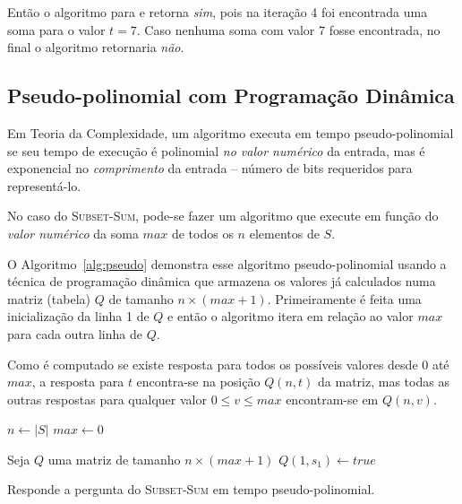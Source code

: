 Então o algoritmo para e retorna \textit{sim}, pois na iteração 4 foi encontrada uma soma para o valor  $t = 7$. Caso nenhuma soma com valor 7 fosse encontrada, no final o algoritmo retornaria \textit{não}.

\subsection{Pseudo-polinomial com Programação Dinâmica}

Em Teoria da Complexidade, um algoritmo executa em tempo pseudo-polinomial se seu tempo de execução é polinomial \textit{no valor numérico} da entrada, mas é exponencial no \textit{comprimento} da entrada -- número de bits requeridos para representá-lo.

No caso do \textsc{Subset-Sum}, pode-se fazer um algoritmo que execute em função do \textit{valor numérico} da soma $max$ de todos os $n$ elementos de $S$.

O Algoritmo~\ref{alg:pseudo} demonstra esse algoritmo pseudo-polinomial usando a técnica de programação dinâmica que armazena os valores já calculados numa matriz (tabela) $Q$ de tamanho $n \times (max + 1)$. Primeiramente é feita uma inicialização da linha 1 de $Q$ e então o algoritmo itera em relação ao valor $max$ para cada outra linha de $Q$.

Como é computado se existe resposta para todos os possíveis valores desde $0$ até $max$, a resposta para $t$ encontra-se na posição $Q(n, t)$ da matriz, mas todas as outras respostas para qualquer valor $0 \leq v \leq max$ encontram-se em $Q(n, v)$.

\begin{algorithm}[h]
	
	$n \leftarrow |S|$\;
	$max \leftarrow 0$\;
	
	
	
	Seja $Q$ uma matriz de tamanho $n \times (max+1)$\;
	$Q(1, s_1) \leftarrow true$\;

	
	\;

\caption{Responde a pergunta do \textsc{Subset-Sum} em tempo pseudo-polinomial. \label{alg:pseudo}}
\end{algorithm}

